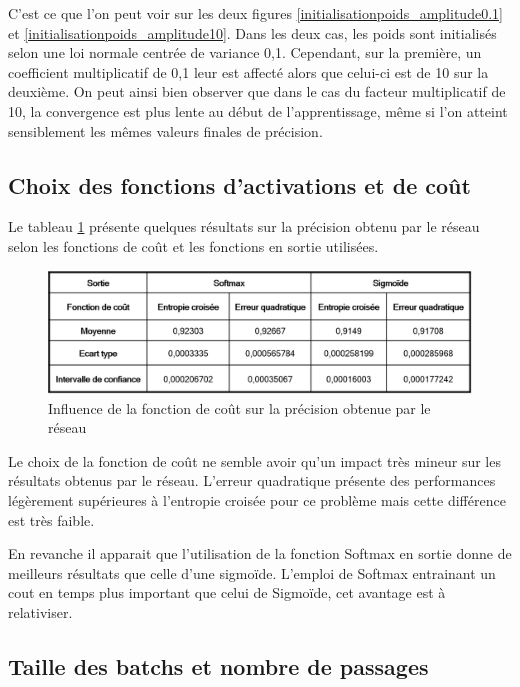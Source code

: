 \documentclass{report}
\theoremstyle{plain}
\theoremstyle{definition}
\theoremstyle{remark}
\begin{document}
C'est ce que l'on peut voir sur les deux figures \ref{initialisationpoids_amplitude0.1} et \ref{initialisationpoids_amplitude10}. Dans les deux cas, les poids sont initialisés selon une loi normale centrée de variance 0,1. Cependant, sur la première, un coefficient multiplicatif de 0,1 leur est affecté alors que celui-ci est de 10 sur la deuxième.
On peut ainsi bien observer que dans le cas du facteur multiplicatif de 10, la convergence est plus lente au début de l'apprentissage, même si l'on atteint sensiblement les mêmes valeurs finales de précision.



\subsection{Choix des fonctions d'activations et de coût}

Le tableau \ref{influence_fonction_cout} présente quelques résultats sur la précision obtenu par le réseau selon les fonctions de coût et les fonctions en sortie utilisées.
\begin{figure}[!h]
\begin{center}
\includegraphics[scale=0.6]{images/influence_fonction_cout.png}
\caption{Influence de la fonction de coût sur la précision obtenue par le réseau}
\label{influence_fonction_cout}
\end{center}
\end{figure}
Le choix de la fonction de coût ne semble avoir qu'un impact très mineur sur les résultats obtenus par le réseau. L'erreur quadratique présente des performances légèrement supérieures à l'entropie croisée pour ce problème mais cette différence est très faible.

En revanche il apparait que l'utilisation de la fonction Softmax en sortie donne de meilleurs résultats que celle d'une sigmoïde. L'emploi de Softmax entrainant un cout en temps plus important que celui de Sigmoïde, cet avantage est à relativiser.


\subsection{Taille des batchs et nombre de passages}
\end{document}
